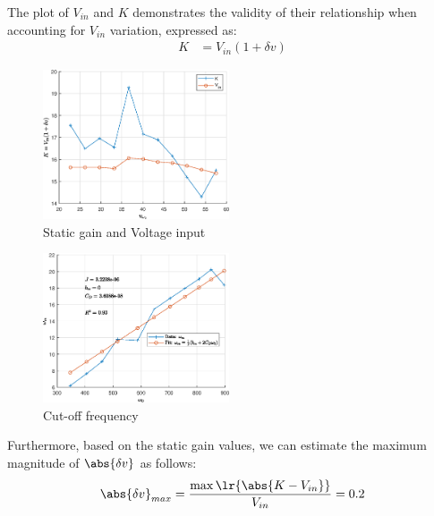 The plot of $V_{in}$ and $K$ demonstrates the validity of their relationship when accounting for $V_{in}$ variation, expressed as:
\begin{align}
    K &= V_{in} (1 + \delta v)
\end{align}
\begin{multicols}{2}
 \begin{figure}[H]
    \centering
    \includegraphics[width = 0.49\textwidth]{Part2/figs/3_figs/small_perturbation/K-Vin.eps}
    \caption{Static gain and Voltage input}
\end{figure}
\begin{figure}[H]
    \centering
    \includegraphics[width = 0.49\textwidth]{Part2/figs/3_figs/small_perturbation/omega_fit.eps}
    \caption{Cut-off frequency}
\end{figure}
\end{multicols}
Furthermore, based on the static gain values, we can estimate the maximum magnitude of $\abs{\delta v}$ as follows:
\begin{align}
    \abs{\delta v}_{max} = \frac{ \max\lr{\abs{K - V_{in}}}}{V_{in}} = 0.2
\end{align}
